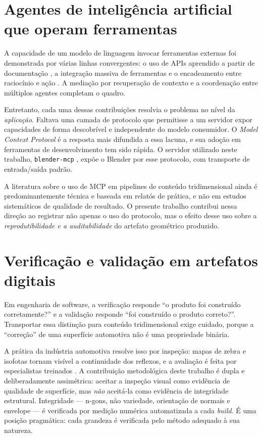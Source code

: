 \section{Agentes de intelig\^encia artificial que operam ferramentas}

A capacidade de um modelo de linguagem invocar ferramentas externas foi demonstrada por v\'arias
linhas convergentes: o uso de APIs aprendido a partir de documenta\c{c}\~ao
\cite{schick2023, patil2023}, a integra\c{c}\~ao massiva de ferramentas \cite{qin2023} e o
encadeamento entre racioc\'inio e a\c{c}\~ao \cite{yao2023}. A media\c{c}\~ao por
recupera\c{c}\~ao de contexto \cite{lewis2020} e a coordena\c{c}\~ao entre m\'ultiplos agentes
\cite{wu2023} completam o quadro.

Entretanto, cada uma dessas contribui\c{c}\~oes resolvia o problema no n\'ivel da
\emph{aplica\c{c}\~ao}. Faltava uma camada de protocolo que permitisse a um servidor expor
capacidades de forma descobr\'ivel e independente do modelo consumidor. O \emph{Model Context
Protocol} \cite{mcpspec2024} \'e a resposta mais difundida a essa lacuna, e sua ado\c{c}\~ao em
ferramentas de desenvolvimento tem sido r\'apida. O servidor utilizado neste trabalho,
\texttt{blender-mcp} \cite{blendermcp2025}, exp\~oe o Blender por esse protocolo, com
transporte de entrada/sa\'ida padr\~ao.

A literatura sobre o uso de MCP em pipelines de conte\'udo tridimensional ainda \'e
predominantemente t\'ecnica e baseada em relat\'os de pr\'atica, e n\~ao em estudos
sistem\'aticos de qualidade de resultado. O presente trabalho contribui nessa dire{\c{c}}\~ao ao
registrar n\~ao apenas o uso do protocolo, mas o efeito desse uso sobre a
\emph{reprodutibilidade e a auditabilidade} do artefato geom\'etrico produzido.

\section{Verifica\c{c}\~ao e valida\c{c}\~ao em artefatos digitais}

Em engenharia de software, a verifica\c{c}\~ao responde ``o produto foi constru\'ido
corretamente?'' e a valida\c{c}\~ao responde ``foi constru\'ido o produto correto?''. Transportar
essa distin{\c{c}}\~ao para conte\'udo tridimensional exige cuidado, porque a
``corre{\c{c}}\~ao'' de uma superf\'icie automotiva n\~ao \'e uma propriedade bin\'aria.

A pr\'atica da ind\'ustria automotiva resolve isso por inspe{\c{c}}\~ao: mapas de zebra e
isofotas tornam vis\'ivel a continuidade dos reflexos, e a avalia{\c{c}}\~ao \'e feita por
especialistas treinados \cite{halstead1993}. A contribui{\c{c}}\~ao metodol\'ogica deste
trabalho \'e dupla e deliberadamente assim\'etrica: aceitar a inspe{\c{c}}\~ao visual como
evid\^encia de qualidade de superf\'icie, mas \emph{n\~ao} aceit\'a-la como evid\^encia de
integridade estrutural. Integridade --- n-gons, n\~ao variedade, orienta{\c{c}}\~ao de normais e
envelope --- \'e verificada por medi{\c{c}}\~ao num\'erica automatizada a cada
\emph{build}. \'E uma posi{\c{c}}\~ao pragm\'atica: cada grandeza \'e verificada pelo m\'etodo
adequado \`a sua natureza.

